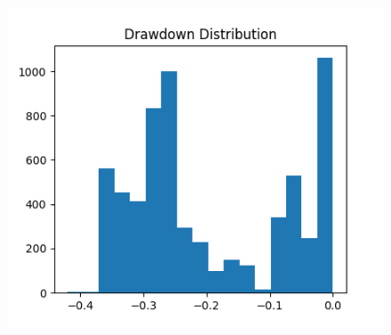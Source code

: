 \documentclass[a4paper]{article}
\begin{document}
\begin{figure}[H]
    \begin{center}
        \includegraphics{../generated/drawdown_dist.png}
    \end{center}
\end{figure}

\end{document}
